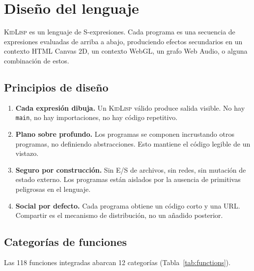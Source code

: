 \documentclass[10pt,letterpaper,twocolumn]{article}
\newcommand{\kidlisp}{\textsc{KidLisp}}
\begin{document}

\section{Diseño del lenguaje}
\label{sec:design}

\kidlisp{} es un lenguaje de S-expresiones. Cada programa es una secuencia de expresiones evaluadas de arriba a abajo, produciendo efectos secundarios en un contexto HTML Canvas 2D, un contexto WebGL, un grafo Web Audio, o alguna combinación de estos.

\subsection{Principios de diseño}

\begin{enumerate}
  \item \textbf{Cada expresión dibuja.} Un \kidlisp{} válido produce salida visible. No hay \texttt{main}, no hay importaciones, no hay código repetitivo.
  \item \textbf{Plano sobre profundo.} Los programas se componen incrustando otros programas, no definiendo abstracciones. Esto mantiene el código legible de un vistazo.
  \item \textbf{Seguro por construcción.} Sin E/S de archivos, sin redes, sin mutación de estado externo. Los programas están aislados por la ausencia de primitivas peligrosas en el lenguaje.
  \item \textbf{Social por defecto.} Cada programa obtiene un código corto y una URL. Compartir es el mecanismo de distribución, no un añadido posterior.
\end{enumerate}

\subsection{Categorías de funciones}

Las 118 funciones integradas abarcan 12 categorías (Tabla~\ref{tab:functions}).
\end{document}
